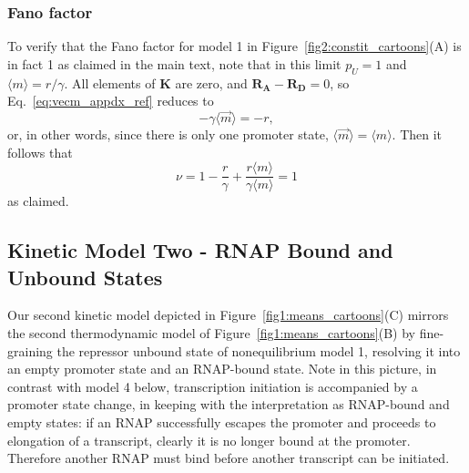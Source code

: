 \subsubsection{Fano factor}
To verify that the Fano factor for model 1 in
Figure~\ref{fig2:constit_cartoons}(A) is in fact 1 as claimed in the main text,
note that in this limit $p_U = 1$ and $\langle{m}\rangle = r/\gamma$. All
elements of $\mathbf{K}$ are zero, and $\mathbf{R_A}-\mathbf{R_D} = 0$, so
Eq.~\ref{eq:vecm_appdx_ref} reduces to
\begin{equation}
- \gamma \langle\vec{m}\rangle = - r,
\end{equation}
or, in other words, since there is only one promoter state,
$\langle\vec{m}\rangle = \langle{m}\rangle$. Then it follows that
\begin{equation}
\nu = 1 -\frac{r}{\gamma}
    + \frac{r \langle{m}\rangle}{\gamma \langle{m}\rangle}
= 1
\end{equation}
as claimed.

\subsection{Kinetic Model Two - RNAP Bound and Unbound States}

Our second kinetic model depicted in Figure~\ref{fig1:means_cartoons}(C) mirrors
the second thermodynamic model of Figure~\ref{fig1:means_cartoons}(B) by
fine-graining  the repressor unbound state of nonequilibrium model 1, resolving
it into an empty promoter state and an RNAP-bound state. Note in this picture,
in contrast with model 4 below, transcription initiation is accompanied by a
promoter state change, in keeping with the interpretation as RNAP-bound and
empty states: if an RNAP successfully escapes the promoter and proceeds to
elongation of a transcript, clearly it is no longer bound at the promoter.
Therefore another RNAP must bind before another transcript can be initiated.

